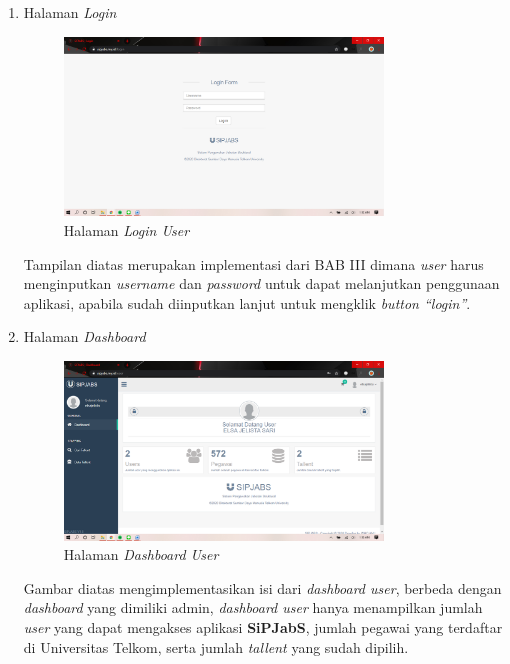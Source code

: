 \begin{enumerate}
	
	\item Halaman \textit{Login}
	\begin{figure}
		\centering
		\includegraphics[width=0.8\textwidth]
		{pics/user/implementasi/login.png}
		\caption{Halaman \textit{Login User}}
		\label{fig:CC10}
	\end{figure}
	
	Tampilan diatas merupakan implementasi dari BAB III dimana \textit{user} harus menginputkan \textit{username} dan \textit{password} untuk dapat melanjutkan penggunaan aplikasi, apabila sudah diinputkan lanjut untuk mengklik \textit{button “login”}. 
	
	\item Halaman \textit{Dashboard}
	\begin{figure}
		\centering
		\includegraphics[width=0.8\textwidth]
		{pics/user/implementasi/dashboard.png}
		\caption{Halaman \textit{Dashboard User}}
		\label{fig:CC10}
	\end{figure}
	
	Gambar diatas mengimplementasikan isi dari \textit{dashboard user}, berbeda dengan \textit{dashboard} yang dimiliki admin, \textit{dashboard user} hanya menampilkan jumlah \textit{user} yang dapat mengakses aplikasi \textbf{SiPJabS}, jumlah pegawai yang terdaftar di Universitas Telkom, serta jumlah \textit{tallent} yang sudah dipilih. 
	

\end{enumerate}
